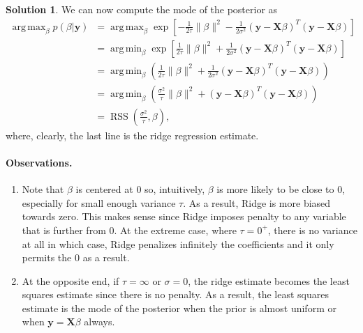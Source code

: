 \documentclass[]{book}
\theoremstyle{definition}
\newtheorem*{soln}{Solution}
\newcommand{\XX}{\mathbf{X}} \newcommand{\YY}{\mathbf{Y}}
\newcommand{\yy}{\mathbf{y}}
\DeclareMathOperator*{\argmax}{arg\,max}
\DeclareMathOperator*{\argmin}{arg\,min} \DeclareMathOperator*{\Cov}{Cov}
\DeclareMathOperator*{\RSS}{RSS} \DeclareMathOperator*{\WRSS}{WRSS}
\begin{document}
\begin{enumerate}
\begin{soln}
		We can now compute the mode of the posterior as
		\begin{equation}
			\begin{split}
				\argmax_\beta p(\beta|\yy) &=
					\argmax_\beta \exp\left[-\frac{1}{2\tau}\|\beta\|^2-\frac{1}{2\sigma^2}(\yy-\XX\beta)^T(\yy-\XX\beta)\right] \\
					&= \argmin_\beta \exp\left[\frac{1}{2\tau}\|\beta\|^2+\frac{1}{2\sigma^2}(\yy-\XX\beta)^T(\yy-\XX\beta)\right] \\
					&= \argmin_\beta \left(\frac{1}{2\tau}\|\beta\|^2+\frac{1}{2\sigma^2}(\yy-\XX\beta)^T(\yy-\XX\beta)\right) \\
					&= \argmin_\beta \left(\frac{\sigma^2}{\tau}\|\beta\|^2+(\yy-\XX\beta)^T(\yy-\XX\beta)\right) \\
					&= \RSS\left(\frac{\sigma^2}{\tau},\beta\right),
			\end{split}
		\end{equation}
		where, clearly, the last line is the ridge regression estimate.

		\paragraph{Observations.}
		\begin{enumerate}
			\item Note that $\beta$ is centered at 0
			so, intuitively, $\beta$ is more likely to be close to 0,
			especially for small enough variance $\tau$. As a result,
			Ridge is more biased towards zero. This makes sense since Ridge 
			imposes penalty to any variable that is further from 0. At the 
			extreme case, where $\tau = 0^+$, there is no variance at all in 
			which case, Ridge penalizes infinitely the coefficients and it only 
			permits the $0$ as a result.

			\item At the opposite end, if $\tau=\infty$ or $\sigma=0$, the ridge 
			estimate becomes the least squares estimate since there is no penalty.
			As a result, the least squares estimate is the mode of the posterior 
			when the prior is almost uniform or when $\yy=\XX\beta$ always.
		\end{enumerate}
	\end{soln}
\end{enumerate}
\end{document}
